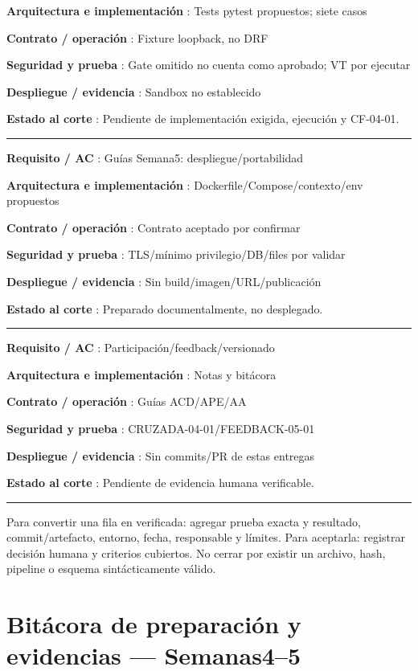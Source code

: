 \documentclass[12pt,a4paper]{report}
\begin{document}
\textbf{Arquitectura e implementación }: Tests pytest propuestos; siete
casos

\textbf{Contrato / operación }: Fixture loopback, no DRF

\textbf{Seguridad y prueba }: Gate omitido no cuenta como aprobado; VT
por ejecutar

\textbf{Despliegue / evidencia }: Sandbox no establecido

\textbf{Estado al corte }: Pendiente de implementación exigida,
ejecución y CF-04-01.

\medskip\hrule\medskip

\textbf{Requisito / AC }: Guías Semana5: despliegue/portabilidad

\textbf{Arquitectura e implementación }: Dockerfile/Compose/contexto/env
propuestos

\textbf{Contrato / operación }: Contrato aceptado por confirmar

\textbf{Seguridad y prueba }: TLS/mínimo privilegio/DB/files por validar

\textbf{Despliegue / evidencia }: Sin build/imagen/URL/publicación

\textbf{Estado al corte }: Preparado documentalmente, no desplegado.

\medskip\hrule\medskip

\textbf{Requisito / AC }: Participación/feedback/versionado

\textbf{Arquitectura e implementación }: Notas y bitácora

\textbf{Contrato / operación }: Guías ACD/APE/AA

\textbf{Seguridad y prueba }: CRUZADA-04-01/FEEDBACK-05-01

\textbf{Despliegue / evidencia }: Sin commits/PR de estas entregas

\textbf{Estado al corte }: Pendiente de evidencia humana verificable.

\medskip\hrule\medskip

Para convertir una fila en verificada: agregar prueba exacta y
resultado, commit/artefacto, entorno, fecha, responsable y límites. Para
aceptarla: registrar decisión humana y criterios cubiertos. No cerrar
por existir un archivo, hash, pipeline o esquema sintácticamente válido.
\chapter{Bitácora de preparación y evidencias ---
Semanas4--5}\label{AA5-semana-5-anexo1-bituxe1cora-de-preparaciuxf3n-y-evidencias--semanas45}
\end{document}
